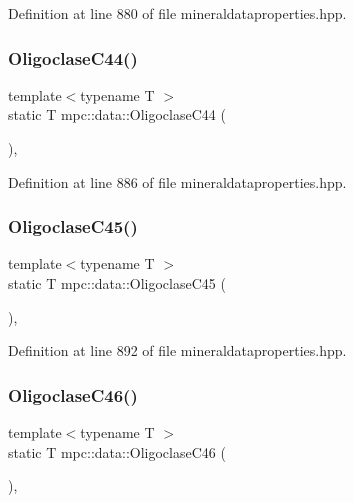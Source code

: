 Definition at line 880 of file mineraldataproperties.\+hpp.

\mbox{\label{namespacempc_1_1data_aa6354a2af96bd73204a7f79a2b87445c}} 
\subsubsection{\texorpdfstring{Oligoclase\+C44()}{OligoclaseC44()}}
{\footnotesize\ttfamily template$<$typename T $>$ \\
static T mpc\+::data\+::\+Oligoclase\+C44 (\begin{DoxyParamCaption}{ }\end{DoxyParamCaption})\hspace{0.3cm}{\ttfamily [inline]}, {\ttfamily [static]}}



Definition at line 886 of file mineraldataproperties.\+hpp.

\mbox{\label{namespacempc_1_1data_a52e3aa447b550fe8e1373c1d640a3b8b}} 
\subsubsection{\texorpdfstring{Oligoclase\+C45()}{OligoclaseC45()}}
{\footnotesize\ttfamily template$<$typename T $>$ \\
static T mpc\+::data\+::\+Oligoclase\+C45 (\begin{DoxyParamCaption}{ }\end{DoxyParamCaption})\hspace{0.3cm}{\ttfamily [inline]}, {\ttfamily [static]}}



Definition at line 892 of file mineraldataproperties.\+hpp.

\mbox{\label{namespacempc_1_1data_abf1b5dff093ded1435b7cb0a198d803f}} 
\subsubsection{\texorpdfstring{Oligoclase\+C46()}{OligoclaseC46()}}
{\footnotesize\ttfamily template$<$typename T $>$ \\
static T mpc\+::data\+::\+Oligoclase\+C46 (\begin{DoxyParamCaption}{ }\end{DoxyParamCaption})\hspace{0.3cm}{\ttfamily [inline]}, {\ttfamily [static]}}



